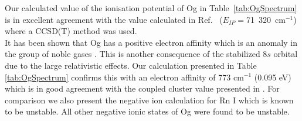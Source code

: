 \documentclass[10pt,a4paper, twoside, openright]{report}
\begin{document}
Our calculated value of the ionisation potential of Og in Table~\ref{tab:OgSpectrum} is in excellent agreement with the value calculated in Ref.~\cite{Jerabek2018} ($E_{IP}=$71~320~cm$^{-1}$) where a CCSD(T) method was used. \\
\linebreak
It has been shown that Og has a positive electron affinity which is an anomaly in the group of noble gases \cite{EliavOg1996, Goidenko2003, Eliav2015}. This is another consequence of the stabilized $8s$ orbital due to the large relativistic effects. Our calculation presented in Table \ref{tab:OgSpectrum}  confirms this with an electron affinity of 773 cm$^{-1}$ (0.095 eV) which is in good agreement with the coupled cluster value presented in \cite{Goidenko2003}. For comparison we also present the negative ion calculation for Rn I which is known to be unstable. All other negative ionic states of Og were found to be unstable.
\newpage
\end{document}
